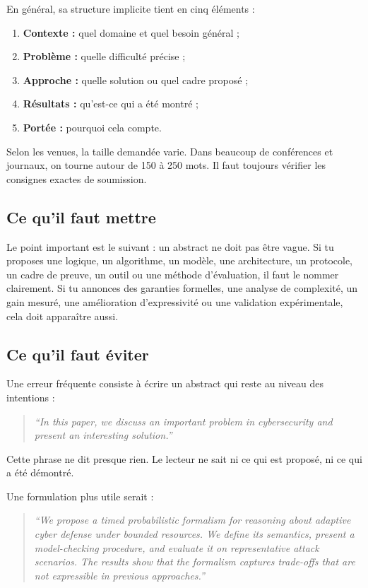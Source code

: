 \documentclass[11pt,a4paper]{article}
\theoremstyle{definition}
\begin{document}
En général, sa structure implicite tient en cinq éléments :
\begin{enumerate}[label=\arabic*.]
    \item \textbf{Contexte :} quel domaine et quel besoin général ;
    \item \textbf{Problème :} quelle difficulté précise ;
    \item \textbf{Approche :} quelle solution ou quel cadre proposé ;
    \item \textbf{Résultats :} qu'est-ce qui a été montré ;
    \item \textbf{Portée :} pourquoi cela compte.
\end{enumerate}
Selon les venues, la taille demandée varie. Dans beaucoup de conférences et journaux, on tourne autour de 150 à 250 mots. Il faut toujours vérifier les consignes exactes de soumission.

\subsection*{Ce qu'il faut mettre}

Le point important est le suivant : un abstract ne doit pas être vague. Si tu proposes une logique, un algorithme, un modèle, une architecture, un protocole, un cadre de preuve, un outil ou une méthode d'évaluation, il faut le nommer clairement. Si tu annonces des garanties formelles, une analyse de complexité, un gain mesuré, une amélioration d'expressivité ou une validation expérimentale, cela doit apparaître aussi.

\subsection*{Ce qu'il faut éviter}

Une erreur fréquente consiste à écrire un abstract qui reste au niveau des intentions :
\begin{quote}
\textit{``In this paper, we discuss an important problem in cybersecurity and present an interesting solution.''}
\end{quote}
Cette phrase ne dit presque rien. Le lecteur ne sait ni ce qui est proposé, ni ce qui a été démontré.

Une formulation plus utile serait :
\begin{quote}
\textit{``We propose a timed probabilistic formalism for reasoning about adaptive cyber defense under bounded resources. We define its semantics, present a model-checking procedure, and evaluate it on representative attack scenarios. The results show that the formalism captures trade-offs that are not expressible in previous approaches.''}
\end{quote}
\end{document}
